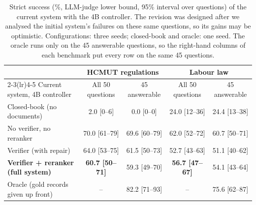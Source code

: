 \documentclass[a4paper,11pt]{article}
\newcommand{\tabstyle}{\centering\small\renewcommand{\arraystretch}{1.1}\setlength{\tabcolsep}{4pt}}
\begin{document}
\begin{table}[!htbp]\tabstyle
\begin{tabular}{@{}lcccc@{}}
\toprule & \multicolumn{2}{c}{HCMUT regulations} & \multicolumn{2}{c}{Labour law}\\\cmidrule(lr){2-3}\cmidrule(lr){4-5}
Current system, 4B controller & All 50 questions & 45 answerable & All 50 questions & 45 answerable\\\midrule
Closed-book (no documents) & 2.0 [0--6] & 0.0 [0--0] & 24.0 [12--36] & 24.4 [13--38]\\
No verifier, no reranker & 70.0 [61--79] & 69.6 [60--79] & 62.0 [52--72] & 60.7 [50--71]\\
Verifier (with repair) & 64.0 [53--75] & 61.5 [50--73] & 52.7 [43--63] & 51.1 [40--62]\\
\textbf{Verifier + reranker (full system)} & \textbf{60.7 [50--71]} & 59.3 [49--70] & \textbf{56.7 [47--67]} & 54.1 [43--64]\\
Oracle (gold records given up front) & -- & 82.2 [71--93] & -- & 75.6 [62--87]\\
\bottomrule\end{tabular}
\caption{Strict success (\%, LLM-judge lower bound, 95\% interval over questions) of the current system with the 4B controller. The revision was designed after we analysed the initial system's failures on these same questions, so its gains may be optimistic. Configurations: three seeds; closed-book and oracle: one seed. The oracle runs only on the 45 answerable questions, so the right-hand columns of each benchmark put every row on the same 45 questions.}\label{tab:main}
\end{table}
\end{document}
